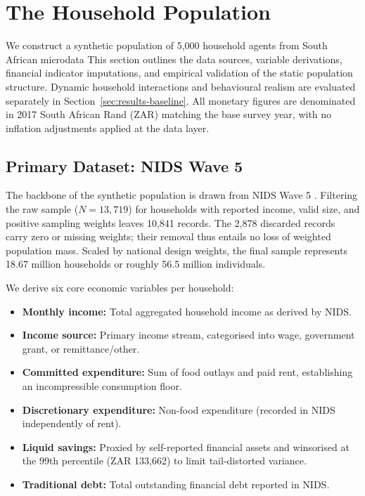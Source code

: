\section{The Household Population}
\label{ch:population}

We construct a synthetic population of 5{,}000 household agents from South African microdata
This section outlines the data sources, variable derivations, financial indicator imputations, and empirical validation of the static population structure.
Dynamic household interactions and behavioural realism are evaluated separately in Section~\ref{sec:results-baseline}.
All monetary figures are denominated in 2017 South African Rand (ZAR) matching the base survey year, with no inflation adjustments applied at the data layer.

\subsection{Primary Dataset: NIDS Wave 5}
\label{sec:backbone}

The backbone of the synthetic population is drawn from \ac{NIDS} Wave 5 \cite{nids_w5_2018}.
Filtering the raw sample ($N = 13,719$) for households with reported income, valid size, and
positive sampling weights leaves 10{,}841 records. The 2{,}878 discarded records carry zero or missing weights; their removal thus entails no loss of weighted population mass. Scaled by national design weights, the final sample represents 18.67 million households or roughly 56.5 million individuals.

We derive six core economic variables per household:
\begin{itemize}
    \item \textbf{Monthly income:} Total aggregated household income as derived by \ac{NIDS}.
    \item \textbf{Income source:} Primary income stream, categorised into wage, government grant, or remittance/other.
    \item \textbf{Committed expenditure:} Sum of food outlays and paid rent, establishing an incompressible consumption floor.
    \item \textbf{Discretionary expenditure:} Non-food expenditure (recorded in \ac{NIDS} independently of rent).
    \item \textbf{Liquid savings:} Proxied by self-reported financial assets and winsorised at the 99th percentile (ZAR 133{,}662) to limit tail-distorted variance.
    \item \textbf{Traditional debt:} Total outstanding financial debt reported in \ac{NIDS}.
\end{itemize}

